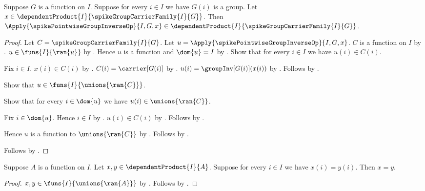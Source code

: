 \begin{proposition}\label{spike_pointwise_group_inverse_type}
    Suppose $G$ is a function on $I$.
    Suppose for every $i\in I$ we have $G(i)$ is a group.
    Let
        $x\in\dependentProduct
            {I}{\spikeGroupCarrierFamily{I}{G}}$.
    Then
        $\Apply{\spikePointwiseGroupInverseOp}{I,G,x}\in
            \dependentProduct{I}{\spikeGroupCarrierFamily{I}{G}}$.
\end{proposition}
\begin{proof}
    Let $C=\spikeGroupCarrierFamily{I}{G}$.
    Let $u=\Apply{\spikePointwiseGroupInverseOp}{I,G,x}$.
    $C$ is a function on $I$ by
        .
    $u\in\funs{I}{\ran{u}}$ by
        .
    Hence $u$ is a function and $\dom{u}=I$ by
        .
    Show that for every $i\in I$ we have $u(i)\in C(i)$.
    \begin{subproof}
        Fix $i\in I$.
        $x(i)\in C(i)$ by .
        $C(i)=\carrier[G(i)]$ by
            .
        $u(i)=\groupInv[G(i)](x(i))$ by
            .
        Follows by .
    \end{subproof}
    Show that $u\in\funs{I}{\unions{\ran{C}}}$.
    \begin{subproof}
        Show that for every $i\in\dom{u}$ we have
            $u(i)\in\unions{\ran{C}}$.
        \begin{subproof}
            Fix $i\in\dom{u}$.
            Hence $i\in I$ by \auto.
            $u(i)\in C(i)$ by \auto.
            Follows by .
        \end{subproof}
        Hence $u$ is a function to $\unions{\ran{C}}$ by
            \auto.
        Follows by .
    \end{subproof}
    Follows by .
\end{proof}

\begin{proposition}\label{spike_dependent_product_extensionality}
    Suppose $A$ is a function on $I$.
    Let $x,y\in\dependentProduct{I}{A}$.
    Suppose for every $i\in I$ we have $x(i)=y(i)$.
    Then $x=y$.
\end{proposition}
\begin{proof}
    $x,y\in\funs{I}{\unions{\ran{A}}}$ by
        .
    Follows by .
\end{proof}

